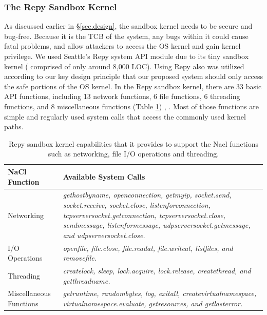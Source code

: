 \subsubsection{The Repy Sandbox Kernel}

As discussed earlier in \S{\ref{sec.design}}, the sandbox kernel needs to be secure and bug-free. 
Because it is the TCB of the system, any bugs within it could cause fatal problems, 
and allow attackers to access the OS kernel and gain kernel privilege. 
We used Seattle's Repy system API module due to its tiny sandbox kernel ( 
comprised of only around 8,000 LOC). Using Repy also was utilized according to our key design principle that 
our proposed system should only access the safe portions of the OS kernel. In the Repy sandbox kernel, 
there are 33 basic API functions, including 13 network functions, 6 file functions, 6 threading functions, 
and 8 miscellaneous functions (Table \ref{table:RepyKernel}) \cite{Repy-10}, \cite{RepyKernel}. Most of those functions are simple and 
regularly used system calls that access the commonly used kernel paths. 


\begin{table}
\centering
\caption {Repy sandbox kernel capabilities that it
provides to support the Nacl functions such as networking, file I/O operations and threading.}

  \begin{tabular}{ | p{2.5cm} | p{4.5cm} |}
 \hline
  \textbf{NaCl Function} & \textbf{Available System Calls}  \\ \hline
    
Networking & \emph{gethostbyname, openconnection, getmyip, socket.send, socket.receive, socket.close, listenforconnection, tcpserversocket.getconnection, tcpserversocket.close, sendmessage, listenformessage, udpserversocket.getmessage, and udpserversocket.close.} \\ \hline
 
I/O Operations & \emph{openfile, file.close, file.readat, file.writeat, listfiles, and removefile.} \\ \hline

Threading & \emph{createlock, sleep, lock.acquire, lock.release, createthread, and getthreadname.} \\ \hline   

Miscellaneous Functions & \emph{getruntime, randombytes, log, exitall, createvirtualnamespace, virtualnamespace.evaluate, getresources, and getlasterror.}  \\ \hline
    \end{tabular}
    \label{table:RepyKernel}
\end{table}

